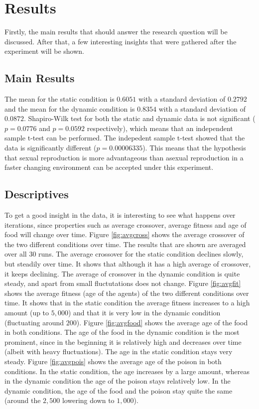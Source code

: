 \section{Results}

Firstly, the main results that should answer the research question will be discussed.
After that, a few interesting insights that were gathered after the experiment will be shown.

\subsection{Main Results}
The mean for the static condition is $0.6051$ with a standard deviation of $0.2792$ and the mean for the dynamic condition is $0.8354$ with a standard deviation of $0.0872$.
Shapiro-Wilk test for both the static and dynamic data is not significant ($p = 0.0776$ and $p = 0.0592$ respectively), which means that an independent sample t-test can be performed. %
The indepedent sample t-test showed that the data is significantly different ($p = 0.00006335$).
This means that the hypothesis that sexual reproduction is more advantageous than asexual reproduction in a faster changing environment can be accepted under this experiment.

\subsection{Descriptives}
To get a good insight in the data, it is interesting to see what happens over iterations, since properties such as average crossover, average fitness and age of food will change over time.
Figure \ref{fig:avgcross} shows the average crossover of the two different conditions over time.
The results that are shown are averaged over all $30$ runs.
The average crossover for the static condition declines slowly, but steadily over time.
It shows that although it has a high average of crossover, it keeps declining.
The average of crossover in the dynamic condition is quite steady, and apart from small fluctutations does not change.
Figure \ref{fig:avgfit} shows the average fitness (age of the agents) of the two different conditions over time.
It shows that in the static condition the average fitness increases to a high amount (up to $5,000$) and that it is very low in the dynamic condition (fluctuating around $200$).
Figure \ref{fig:avgfood} shows the average age of the food in both conditions.
The age of the food in the dynamic condition is the most prominent, since in the beginning it is relatively high and decreases over time (albeit with heavy fluctuations).
The age in the static condition stays very steady.
Figure \ref{fig:avgpois} shows the average age of the poison in both conditions.
In the static condition, the age increases by a large amount, whereas in the dynamic condition the age of the poison stays relatively low.
In the dynamic condition, the age of the food and the poison stay quite the same (around the $2,500$ lowering down to $1,000$).

